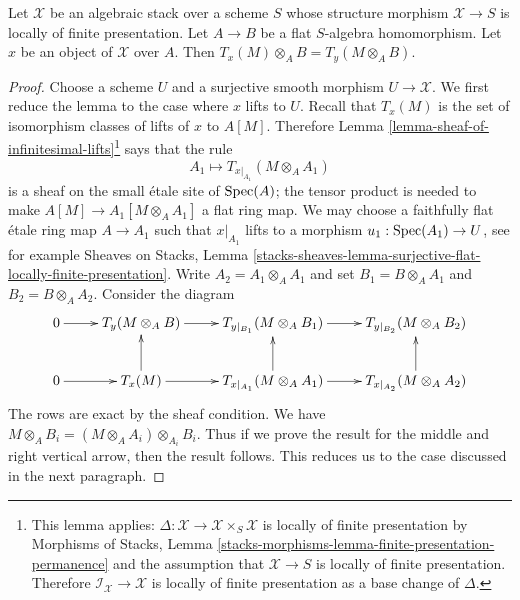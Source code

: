 \begin{lemma}
\label{lemma-T-quasi-coherent}
Let $\mathcal{X}$ be an algebraic stack over a scheme $S$ whose
structure morphism $\mathcal{X} \to S$ is locally of finite presentation.
Let $A \to B$ be a flat $S$-algebra homomorphism.
Let $x$ be an object of $\mathcal{X}$ over $A$.
Then $T_x(M) \otimes_A B = T_y(M \otimes_A B)$.
\end{lemma}

\begin{proof}
Choose a scheme $U$ and a surjective smooth morphism $U \to \mathcal{X}$.
We first reduce the lemma to the case where $x$ lifts to $U$.
Recall that $T_x(M)$ is the set of isomorphism classes of lifts of $x$
to $A[M]$. Therefore
Lemma \ref{lemma-sheaf-of-infinitesimal-lifts}\footnote{This lemma applies:
$\Delta : \mathcal{X} \to \mathcal{X} \times_S \mathcal{X}$
is locally of finite presentation by
Morphisms of Stacks, Lemma
\ref{stacks-morphisms-lemma-finite-presentation-permanence}
and the assumption that $\mathcal{X} \to S$ is locally of finite presentation.
Therefore $\mathcal{I}_\mathcal{X} \to \mathcal{X}$ is locally
of finite presentation as a base change of $\Delta$.}
says that the rule
$$
A_1 \mapsto T_{x|_{A_1}}(M \otimes_A A_1)
$$
is a sheaf on the small \'etale site of $\mathop{\mathrm{Spec}}(A)$; the tensor product
is needed to make $A[M] \to A_1[M \otimes_A A_1]$ a flat ring map.
We may choose a faithfully flat \'etale ring map $A \to A_1$
such that $x|_{A_1}$ lifts to a morphism $u_1 : \mathop{\mathrm{Spec}}(A_1) \to U$, see
for example Sheaves on Stacks, Lemma
\ref{stacks-sheaves-lemma-surjective-flat-locally-finite-presentation}.
Write $A_2 = A_1 \otimes_A A_1$ and set $B_1 = B \otimes_A A_1$
and $B_2 = B \otimes_A A_2$. Consider the diagram
$$
\xymatrix{
0 \ar[r] &
T_y(M \otimes_A B) \ar[r] &
T_{y|_{B_1}}(M \otimes_A B_1) \ar[r] &
T_{y|_{B_2}}(M \otimes_A B_2) \\
0 \ar[r] &
T_x(M) \ar[r] \ar[u] &
T_{x|_{A_1}}(M \otimes_A A_1) \ar[r] \ar[u] &
T_{x|_{A_2}}(M \otimes_A A_2) \ar[u]
}
$$
The rows are exact by the sheaf condition. We have
$M \otimes_A B_i = (M \otimes_A A_i) \otimes_{A_i} B_i$.
Thus if we prove the result for the middle and right vertical arrow, then
the result follows. This reduces us to the case discussed in
the next paragraph.


\end{proof}
